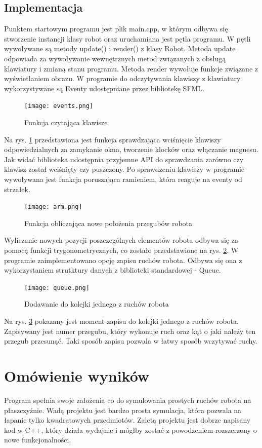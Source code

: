 \documentclass{article}
\begin{document}
\subsection{Implementacja}
Punktem startowym programu jest plik main.cpp, w którym odbywa się
stworzenie instancji klasy robot oraz uruchamiana jest pętla programu.
W pętli wywoływane są metody update() i render() z klasy Robot. Metoda update
odpowiada za wywoływanie wewnętrznych metod związanych z obsługą klawiatury i 
zmianą stanu programu. Metoda render wywołuje funkcje związane z wyświetlaniem
obrazu. W programie do odczytywania klawiszy z klawiatury wykorzystywane są
Eventy udostępniane przez bibliotekę SFML. 
\begin{figure}[h!]
    \texttt{[image: events.png]}
    \caption{Funkcja czytająca klawisze}
    \label{events}
\end{figure}
Na rys. \ref{events} przedstawiona jest funkcja sprawdzająca wciśnięcie klawiszy
odpowiedzialnych za zamykanie okna, tworzenie klocków oraz włączanie magnesu.
\newpage
Jak widać biblioteka udostępnia przyjemne API do sprawdzania zarówno czy klawisz 
został wciśnięty czy puszczony. Po sprawdzeniu klawiszy w programie 
wywoływana jest funkcja poruszająca ramieniem, która reaguje na eventy od strzałek.
\begin{figure}[h!]
    \texttt{[image: arm.png]}
    \caption{Funkcja obliczająca nowe położenia przegubów robota}
    \label{arm}
\end{figure}
Wyliczanie nowych pozycji poszczególnych elementów robota odbywa się za pomocą 
funkcji trygonometrycznych, co zostało przedstawione na rys. \ref{arm}.
\newpage
W programie zaimplementowano opcję zapisu ruchów robota. Odbywa się ona z wykorzystaniem
strutktury danych z biblioteki standardowej - Queue.
\begin{figure}[h!]
    \texttt{[image: queue.png]}
    \caption{Dodawanie do kolejki jednego z ruchów robota}
    \label{queue}
\end{figure}
Na rys. \ref{queue} pokazany jest moment zapisu do kolejki jednego z ruchów robota.
Zapisywany jest numer przegubu, który wykonuje ruch oraz kąt o jaki należy ten przegub 
przesunąć. Taki sposób zapisu pozwala w łatwy sposób wczytywać ruchy.
\section{Omówienie wyników}
Program spełnia swoje założenia co do symulowania prostych ruchów robota na płaszczyźnie.
Wadą projektu jest bardzo prosta symulacja, która pozwala na łapanie tylko kwadratowych przedmiotów.
Zaletą projektu jest dobrze napisany kod w C++, który działa wydajnie i mógłby zostać z powodzeniem
rozszerzony o nowe funkcjonalności.
\end{document}
